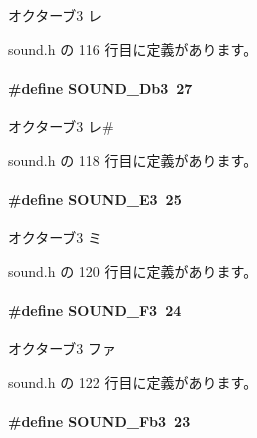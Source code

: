 オクターブ3 レ 



 sound.\+h の 116 行目に定義があります。

\paragraph[{S\+O\+U\+N\+D\+\_\+\+Db3}]{\setlength{\rightskip}{0pt plus 5cm}\#define S\+O\+U\+N\+D\+\_\+\+Db3~27}\label{sound_8h_a1cfd87bf68ec505eec2f20f710ce0189_a1cfd87bf68ec505eec2f20f710ce0189}


オクターブ3 レ\# 



 sound.\+h の 118 行目に定義があります。

\paragraph[{S\+O\+U\+N\+D\+\_\+\+E3}]{\setlength{\rightskip}{0pt plus 5cm}\#define S\+O\+U\+N\+D\+\_\+\+E3~25}\label{sound_8h_a7c3d885a2a78b0ac306c3d275233e037_a7c3d885a2a78b0ac306c3d275233e037}


オクターブ3 ミ 



 sound.\+h の 120 行目に定義があります。

\paragraph[{S\+O\+U\+N\+D\+\_\+\+F3}]{\setlength{\rightskip}{0pt plus 5cm}\#define S\+O\+U\+N\+D\+\_\+\+F3~24}\label{sound_8h_aee1dad36946f9a025e2067788b62e575_aee1dad36946f9a025e2067788b62e575}


オクターブ3 ファ 



 sound.\+h の 122 行目に定義があります。

\paragraph[{S\+O\+U\+N\+D\+\_\+\+Fb3}]{\setlength{\rightskip}{0pt plus 5cm}\#define S\+O\+U\+N\+D\+\_\+\+Fb3~23}\label{sound_8h_a4502a83bac176348b5c7b0677341fc26_a4502a83bac176348b5c7b0677341fc26}


